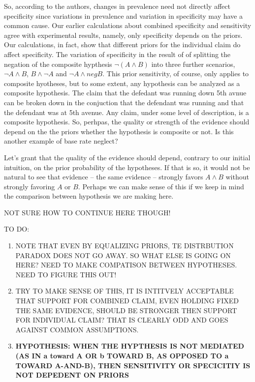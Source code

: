 \documentclass[
  10pt,
  dvipsnames,enabledeprecatedfontcommands]{scrartcl}
\begin{document}
So, according to the authors, changes in prevalence need not directly
affect specificity since variations in prevalence and variation in
specificity may have a common cause. Our earlier calculations about
combined specificity and sensitivity agree with experimental results,
namely, only specificity depends on the priors. Our calculations, in
fact, show that different priors for the individual claim do affect
specificity. The variation of specificity in the result of of splitting
the negation of the composite hypthesis \(\neg (A \wedge B)\) into three
further scenarios, \(\neg A \wedge B\), \(B \wedge \neg A\) and
\(\neg A \wedge neg B\). This prior sensitivity, of course, only applies
to composite hyotheses, but to some extent, any hypothesis can be
analyzed as a composite hypothesis. The claim that the defedant was
running down 5th avnue can be broken down in the conjuction that the
defendant was running and that the defendant was at 5th avenue. Any
claim, under some level of description, is a composite hypothesis. So,
perhpas, the quality or strength of the evidence should depend on the
the priors whether the hypothesis is composite or not. Is this another
example of base rate neglect?

Let's grant that the quality of the evidence should depend, contrary to
our initial intuition, on the prior probability of the hypotheses. If
that is so, it would not be natural to see that evidence -- the same
evidence -- strongly favors \(A\wedge B\) without strongly favoring
\(A\) or \(B\). Perhaps we can make sense of this if we keep in mind the
comparison between hypothesis we are making here.

NOT SURE HOW TO CONTINUE HERE THOUGH!

TO DO:

\begin{enumerate}
\def\labelenumi{\arabic{enumi}.}
\item
  NOTE THAT EVEN BY EQUALIZING PRIORS, TE DISTRBUTION PARADOX DOES NOT
  GO AWAY. SO WHAT ELSE IS GOING ON HERE? NEED TO MAKE COMPATISON
  BETWEEN HYPOTHESES. NEED TO FIGURE THIS OUT!
\item
  TRY TO MAKE SENSE OF THIS, IT IS INTITVELY ACCEPTABLE THAT SUPPORT FOR
  COMBINED CLAIM, EVEN HOLDING FIXED THE SAME EVIDENCE, SHOULD BE
  STRONGER THEN SUPPORT FOR INDIVIDUAL CLAIM? THAT IS CLEARLY ODD AND
  GOES AGAINST COMMON ASSUMPTIONS.
\item
  \textbf{HYPOTHESIS: WHEN THE HYPTHESIS IS NOT MEDIATED (AS IN a toward A OR b TOWARD B, AS OPPOSED TO a TOWARD A-AND-B), THEN SENSITIVITY OR SPECICITIY IS NOT DEPEDENT ON PRIORS}
\end{enumerate}
\end{document}
